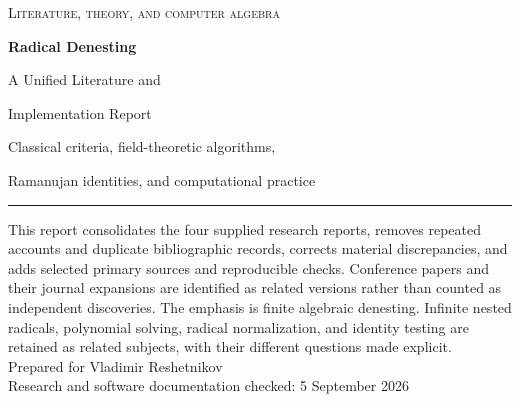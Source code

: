 \documentclass[11pt,a4paper]{article}
\numberwithin{equation}{section}
\theoremstyle{definition}\newtheorem{definition}[theorem]{Definition}
\theoremstyle{remark}\newtheorem{remark}[theorem]{Remark}
\begin{document}
\begin{titlepage}
\thispagestyle{empty}
\vspace*{18mm}
{\large\scshape Literature, theory, and computer algebra\par}
\vspace{10mm}
{\Huge\bfseries Radical Denesting\par}
\vspace{4mm}
{\LARGE A Unified Literature and\par Implementation Report\par}
\vspace{10mm}
{\large Classical criteria, field-theoretic algorithms,\par Ramanujan identities, and computational practice\par}
\vspace{15mm}
\noindent\rule{\textwidth}{0.6pt}
\vspace{5mm}
\noindent This report consolidates the four supplied research reports, removes repeated accounts and duplicate bibliographic records, corrects material discrepancies, and adds selected primary sources and reproducible checks. Conference papers and their journal expansions are identified as related versions rather than counted as independent discoveries.
\vspace{6mm}
\noindent The emphasis is finite algebraic denesting. Infinite nested radicals, polynomial solving, radical normalization, and identity testing are retained as related subjects, with their different questions made explicit.
\vfill
\noindent Prepared for Vladimir Reshetnikov\\
Research and software documentation checked: 5 September 2026
\end{titlepage}

\begin{abstract}
Radical denesting asks whether a number already represented by nested radicals has an equivalent expression with fewer radical layers. This survey unifies the classical square-root criteria, the algorithmic work of Caviness--Fateman, Borodin--Fagin--Hopcroft--Tompa, Zippel, Landau, Horng--Huang, and Bl\"omer, later results on Ramanujan-type identities and restricted higher-index radicals, and the interfaces actually offered by computer-algebra systems. It separates four easily confused measures: expression depth, algebraic degree, output size, and the size of a splitting-field representation. A branch-aware elementary development supplies proofs and diagnostic examples. An annotated bibliography links primary articles, theses, books, software documentation, and useful discussions. Substantive corrections include the alleged equivalence of rational cubic denesting to integer factorization, the misreading of SymPy's iteration bound as a depth bound, and several bibliographic and real-versus-complex ambiguities. Small exact computations accompany the survey; they are not presented as benchmarks of systems that were not executed.
\end{abstract}
\tableofcontents
\clearpage
\end{document}
